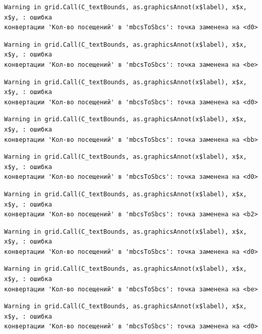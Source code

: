 \documentclass[
  letterpaper,
  DIV=11,
  numbers=noendperiod]{scrreprt}
\begin{document}
\begin{verbatim}
Warning in grid.Call(C_textBounds, as.graphicsAnnot(x$label), x$x, x$y, : ошибка
конвертации 'Кол-во посещений' в 'mbcsToSbcs': точка заменена на <d0>
\end{verbatim}

\begin{verbatim}
Warning in grid.Call(C_textBounds, as.graphicsAnnot(x$label), x$x, x$y, : ошибка
конвертации 'Кол-во посещений' в 'mbcsToSbcs': точка заменена на <be>
\end{verbatim}

\begin{verbatim}
Warning in grid.Call(C_textBounds, as.graphicsAnnot(x$label), x$x, x$y, : ошибка
конвертации 'Кол-во посещений' в 'mbcsToSbcs': точка заменена на <d0>
\end{verbatim}

\begin{verbatim}
Warning in grid.Call(C_textBounds, as.graphicsAnnot(x$label), x$x, x$y, : ошибка
конвертации 'Кол-во посещений' в 'mbcsToSbcs': точка заменена на <bb>
\end{verbatim}

\begin{verbatim}
Warning in grid.Call(C_textBounds, as.graphicsAnnot(x$label), x$x, x$y, : ошибка
конвертации 'Кол-во посещений' в 'mbcsToSbcs': точка заменена на <d0>
\end{verbatim}

\begin{verbatim}
Warning in grid.Call(C_textBounds, as.graphicsAnnot(x$label), x$x, x$y, : ошибка
конвертации 'Кол-во посещений' в 'mbcsToSbcs': точка заменена на <b2>
\end{verbatim}

\begin{verbatim}
Warning in grid.Call(C_textBounds, as.graphicsAnnot(x$label), x$x, x$y, : ошибка
конвертации 'Кол-во посещений' в 'mbcsToSbcs': точка заменена на <d0>
\end{verbatim}

\begin{verbatim}
Warning in grid.Call(C_textBounds, as.graphicsAnnot(x$label), x$x, x$y, : ошибка
конвертации 'Кол-во посещений' в 'mbcsToSbcs': точка заменена на <be>
\end{verbatim}

\begin{verbatim}
Warning in grid.Call(C_textBounds, as.graphicsAnnot(x$label), x$x, x$y, : ошибка
конвертации 'Кол-во посещений' в 'mbcsToSbcs': точка заменена на <d0>
\end{verbatim}
\end{document}

